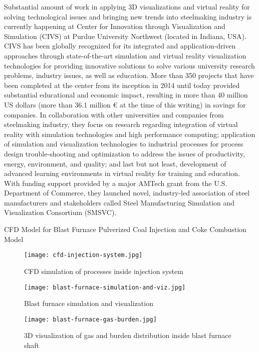 Substantial amount of work in applying 3D visualizations and virtual reality for solving technological issues and bringing new trends into steelmaking industry is currently happening at Center for Innovation through Visualization and Simulation (CIVS) at Purdue University Northwest (located in Indiana, USA). CIVS has been globally recognized for its integrated and application-driven approaches through state-of-the-art simulation and virtual reality visualization technologies for providing innovative solutions to solve various university research problems, industry issues, as well as education. More than 350 projects that have been completed at the center from its inception in 2014 until today provided substantial educational and economic impact, resulting in more than 40 million US dollars (more than 36.1 million € at the time of this writing) in savings for companies. In collaboration with other universities and companies from steelmaking industry, they focus on research regarding integration of virtual reality with simulation technologies and high performance computing; application of simulation and visualization technologies to industrial processes for process design trouble-shooting and optimization to address the issues of productivity, energy, environment, and quality; and last but not least, development of advanced learning environments in virtual reality for training and education. With funding support provided by a major AMTech grant from the U.S. Department of Commerce, they launched novel, industry-led association of steel manufacturers and stakeholders called Steel Manufacturing Simulation and Visualization Consortium (SMSVC).

CFD Model for Blast Furnace Pulverized Coal Injection and Coke Combustion Model

\begin{figure}[h!]
	\centering
	\texttt{[image: cfd-injection-system.jpg]}
	\caption{CFD simulation of processes inside injection system}
	\label{o:m8}
\end{figure}

\begin{figure}[h!]
	\centering
	\texttt{[image: blast-furnace-simulation-and-viz.jpg]}
	\caption{Blast furnace simulation and visualization}
	\label{o:m9}
\end{figure}

\begin{figure}[h!]
	\centering
	\texttt{[image: blast-furnace-gas-burden.jpg]}
	\caption{3D visualization of gas and burden distribution inside blast furnace shaft}
	\label{o:m10}
\end{figure}


